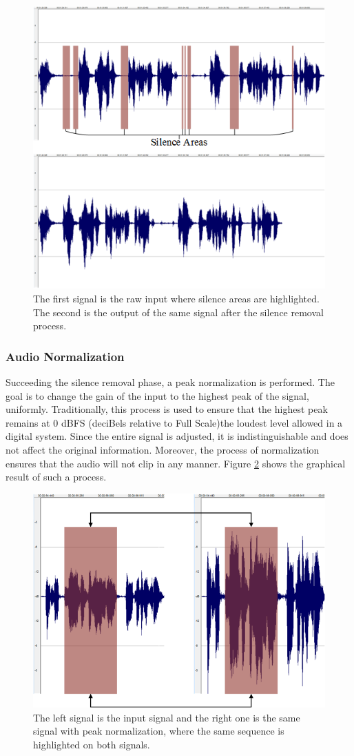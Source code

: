 \documentclass[cryptography,article,submit,moreauthors,pdftex,10pt,a4paper]{mdpi}
\begin{document}
\begin{figure}[H]
	\centering
	\includegraphics[width=8 cm]{2.png}
	\caption{The first signal is the raw input where silence areas are highlighted. The second is the output of the same signal after the silence removal process.}
	\label{fig:2}
\end{figure}

\subsubsection{Audio Normalization}

Succeeding the silence removal phase, a peak normalization is performed. The goal is to change the gain of the input to the highest peak of the signal, uniformly. Traditionally, this process is used to ensure that the highest peak remains at 0 dBFS (deciBels relative to Full Scale)\textemdash the loudest level allowed in a digital system. Since the entire signal is adjusted, it is indistinguishable and does not affect the original information. Moreover, the process of normalization ensures that the audio will not clip in any manner. Figure \ref{fig:3} shows the graphical result of such a process.

\begin{figure}[H]
	\centering
	\includegraphics[width=8 cm]{3.png}
	\caption{The left signal is the input signal and the right one is the same signal with peak normalization, where the same sequence is highlighted on both signals.}
	\label{fig:3}
\end{figure}
\end{document}
